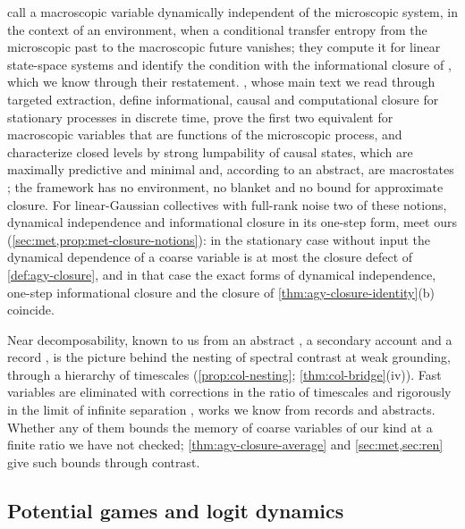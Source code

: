 \citet{barnett2023dynamical} call a macroscopic variable dynamically independent of the microscopic system, in the context of an environment, when a conditional transfer entropy from the microscopic past to the macroscopic future vanishes; they compute it for linear state-space systems and identify the condition with the informational closure of \citet{bertschinger2006information}, which we know through their restatement. \citet{rosas2024software}, whose main text we read through targeted extraction, define informational, causal and computational closure for stationary processes in discrete time, prove the first two equivalent for macroscopic variables that are functions of the microscopic process, and characterize closed levels by strong lumpability of causal states, which are maximally predictive and minimal \citep{shalizi2001computational} and, according to an abstract, are macrostates \citep{shalizi2025macrostate}; the framework has no environment, no blanket and no bound for approximate closure. For linear-Gaussian collectives with full-rank noise two of these notions, dynamical independence and informational closure in its one-step form, meet ours (\cref{sec:met,prop:met-closure-notions}): in the stationary case without input the dynamical dependence of a coarse variable is at most the closure defect of \cref{def:agy-closure}, and in that case the exact forms of dynamical independence, one-step informational closure and the closure of \cref{thm:agy-closure-identity}(b) coincide.

Near decomposability, known to us from an abstract \citep{simon1961aggregation}, a secondary account \citep{simon1962architecture} and a record \citep{courtois1977decomposability}, is the picture behind the nesting of spectral contrast at weak grounding, through a hierarchy of timescales (\cref{prop:col-nesting}; \cref{thm:col-bridge}(iv)). Fast variables are eliminated with corrections in the ratio of timescales \citep{vankampen1985elimination,geigenmuller1983systematic,haken1982slaving} and rigorously in the limit of infinite separation \citep{pavliotis2008multiscale,berglund2006noise,givon2004extracting}, works we know from records and abstracts. Whether any of them bounds the memory of coarse variables of our kind at a finite ratio we have not checked; \cref{thm:agy-closure-average} and \cref{sec:met,sec:ren} give such bounds through contrast.

\subsection{Potential games and logit dynamics}\label{sec:rel-games}

